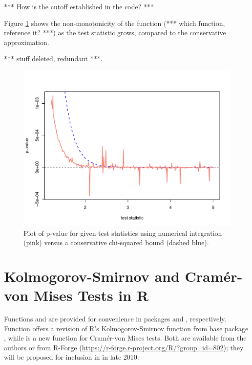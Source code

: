 *** How is the cutoff established in the code? ***

Figure \ref{cvmissues} shows the non-monotonicity of the function 
(*** which function, reference it? ***) as the test statistic grows, 
compared to the conservative approximation. 

*** stuff deleted, redundant ***.

\begin{figure}
\begin{center}
\includegraphics[scale=0.4]{fig1.pdf}
\end{center}
\caption{Plot of p-value for given test statistics using numerical integration
(pink) versus a conservative chi-squared bound (dashed blue). }
\label{cvmissues}
\end{figure}


\section{Kolmogorov-Smirnov and Cram\'{e}r-von Mises Tests in R}

Functions  and  are provided for
convenience in packages  and , respectively.
Function  offers a revision of
R's Kolmogorov-Smirnov function  from base
package , while  is a new
function for Cram\'{e}r-von Mises tests.
Both are available from the authors
or from R-Forge (\url{https://r-forge.r-project.org/R/?group_id=802});
they will be proposed for inclusion in  in late 2010.

